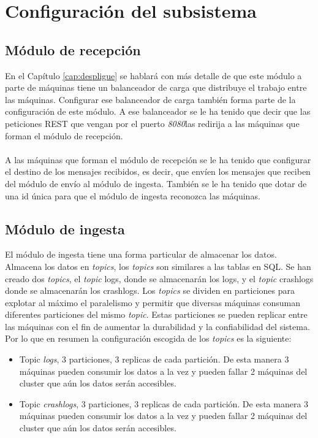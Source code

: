 \section{Configuración del subsistema}

\subsection{Módulo de recepción}

En el Capítulo \ref{cap:despligue} se hablará con más detalle de que este módulo a parte de máquinas tiene un balanceador de carga que distribuye el trabajo entre las máquinas. Configurar ese balanceador de carga también forma parte de la configuración de este módulo. A ese balanceador se le ha tenido que decir que las peticiones REST que vengan por el puerto \textit{8080}las redirija a las máquinas que forman el módulo de recepción.
\\\\
A las máquinas que forman el módulo de recepción se le ha tenido que configurar el destino de los mensajes recibidos, es decir, que envíen los mensajes que reciben del módulo de envío al módulo de ingesta. También se le ha tenido que dotar de una id única para que el módulo de ingesta reconozca las máquinas.

\subsection{Módulo de ingesta}

El módulo de ingesta tiene una forma particular de almacenar los datos. Almacena los datos en \textit{topics}, los \textit{topics} son similares a las tablas en SQL. Se han creado dos \textit{topics}, el \textit{topic} logs, donde se almacenarán los logs, y el \textit{topic} crashlogs donde se almacenarán los crashlogs. Los \textit{topics} se dividen en particiones para explotar al máximo el paralelismo y permitir que diversas máquinas consuman diferentes particiones del mismo \textit{topic}. Estas particiones se pueden replicar entre las máquinas con el fin de aumentar la durabilidad y la confiabilidad del sistema. Por lo que en resumen la configuración escogida de los \textit{topics} es la siguiente:

\begin{itemize}
	\item Topic \textit{logs}, 3 particiones, 3 replicas de cada partición. De esta manera 3 máquinas pueden consumir los datos a la vez y pueden fallar 2 máquinas del cluster que aún los datos serán accesibles.
	\item Topic \textit{crashlogs}, 3 particiones, 3 replicas de cada partición. De esta manera 3 máquinas pueden consumir los datos a la vez y pueden fallar 2 máquinas del cluster que aún los datos serán accesibles.
\end{itemize}

